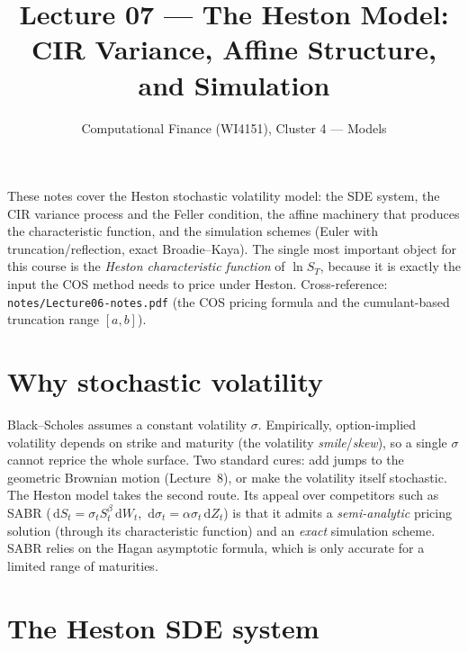 \documentclass[11pt]{article}
\title{Lecture 07 --- The Heston Model: CIR Variance, Affine Structure, and Simulation}
\author{Computational Finance (WI4151), Cluster 4 --- Models}
\date{}
\newcommand{\dd}{\,\mathrm{d}}
\begin{document}
\maketitle

\noindent
These notes cover the Heston stochastic volatility model: the SDE system, the CIR
variance process and the Feller condition, the affine machinery that produces the
characteristic function, and the simulation schemes (Euler with truncation/reflection,
exact Broadie--Kaya). The single most important object for this course is the
\emph{Heston characteristic function} of $\ln S_T$, because it is exactly the input the
COS method needs to price under Heston. Cross-reference: \texttt{notes/Lecture06-notes.pdf}
(the COS pricing formula and the cumulant-based truncation range $[a,b]$).

\section{Why stochastic volatility}

Black--Scholes assumes a constant volatility $\sigma$. Empirically, option-implied
volatility depends on strike and maturity (the volatility \emph{smile}/\emph{skew}), so a
single $\sigma$ cannot reprice the whole surface. Two standard cures: add jumps to the
geometric Brownian motion (Lecture~8), or make the volatility itself stochastic. The
Heston model takes the second route. Its appeal over competitors such as SABR
($\dd S_t = \sigma_t S_t^\beta \dd W_t$, $\dd \sigma_t = \alpha \sigma_t \dd Z_t$) is that
it admits a \emph{semi-analytic} pricing solution (through its characteristic function)
and an \emph{exact} simulation scheme. SABR relies on the Hagan asymptotic formula, which
is only accurate for a limited range of maturities.

\section{The Heston SDE system}
\end{document}
